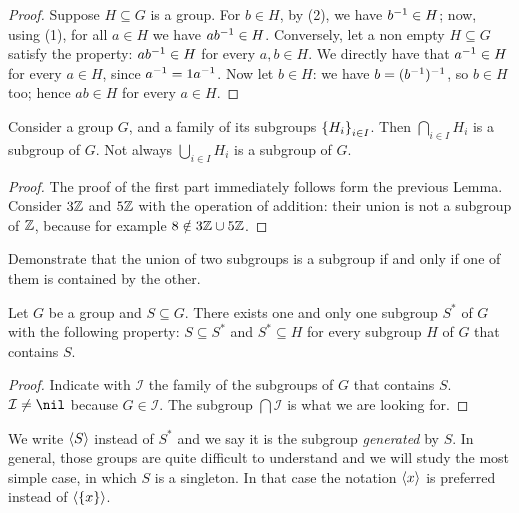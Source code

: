 \begin{proof}
Suppose \(H \subseteq G\) is a group. For \(b \in H\), by (2), we have \(b^{-1} \in H\); now, using (1), for all \(a \in H\) we have \(ab^{-1} \in H\). Conversely, let a non empty \(H \subseteq G\) satisfy the property: \(a b^{-1} \in H\) for every \(a, b \in H\). We directly have that \(a^{-1} \in H\) for every \(a \in H\), since \(a^{-1} = 1 a^{-1}\). Now let \(b \in H\): we have \(b = (b^{-1})^{-1}\), so \(b \in H\) too; hence \(a b \in H\) for every \(a \in H\).
\end{proof}

\begin{proposition}
Consider a group \(G\), and a family of its subgroups \(\left\{H_i\right\}_{i \in I}\). Then \(\bigcap_{i \in I} H_i\) is a subgroup of \(G\). Not always \(\bigcup_{i \in I} H_i\) is a subgroup of \(G\).
\end{proposition}

\begin{proof}
The proof of the first part immediately follows form the previous Lemma. Consider \(3 \mathbb Z\) and \(5\mathbb Z\) with the operation of addition: their union is not a subgroup of \(\mathbb Z\), because for example \(8 \notin 3\mathbb Z \cup 5\mathbb Z\).
\end{proof}

\begin{exercise}
Demonstrate that the union of two subgroups is a subgroup if and only if one of them is contained by the other.
\end{exercise}

\begin{proposition}
Let \(G\) be a group and \(S \subseteq G\). There exists one and only one subgroup \(S^\ast\) of \(G\) with the following property: \(S \subseteq S^\ast\) and \(S^\ast \subseteq H\) for every subgroup \(H\) of \(G\) that contains \(S\).
\end{proposition}

\begin{proof}
Indicate with \(\mathcal I\) the family of the subgroups of \(G\) that contains \(S\). \(\mathcal I \ne \nil\) because \(G \in \mathcal I\). The subgroup \(\bigcap \mathcal I\) is what we are looking for.
\end{proof}

We write \(\left\langle S\right\rangle\) instead of \(S^\ast\) and we say it is the subgroup {\em generated} by \(S\). In general, those groups are quite difficult to understand and we will study the most simple case, in which \(S\) is a singleton. In that case the notation \(\left\langle x\right\rangle\) is preferred instead of \(\left\langle\left\{x\right\}\right\rangle\).
